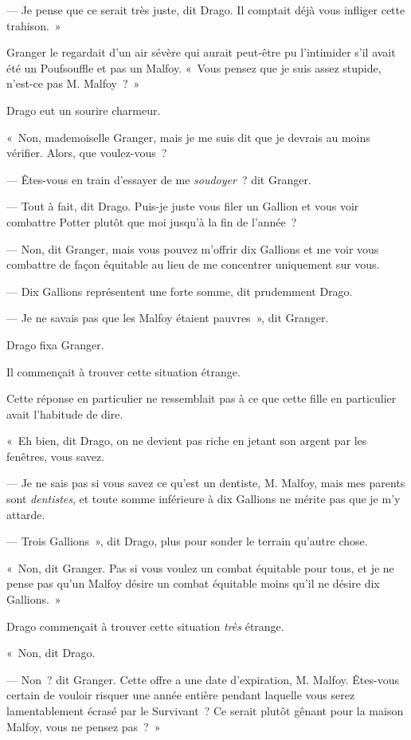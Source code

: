 --- Je pense que ce serait très juste, dit Drago. Il comptait déjà vous infliger cette trahison.~»

Granger le regardait d'un air sévère qui aurait peut-être pu l'intimider s'il avait été un Poufsouffle et pas un Malfoy. «~Vous pensez que je suis assez stupide, n'est-ce pas M. Malfoy~?~»

Drago eut un sourire charmeur.

«~Non, mademoiselle Granger, mais je me suis dit que je devrais au moins vérifier. Alors, que voulez-vous~?

--- Êtes-vous en train d'essayer de me \emph{soudoyer}~? dit Granger.

--- Tout à fait, dit Drago. Puis-je juste vous filer un Gallion et vous voir combattre Potter plutôt que moi jusqu'à la fin de l'année~?

--- Non, dit Granger, mais vous pouvez m'offrir dix Gallions et me voir vous combattre de façon équitable au lieu de me concentrer uniquement sur vous.

--- Dix Gallions représentent une forte somme, dit prudemment Drago.

--- Je ne savais pas que les Malfoy étaient pauvres~», dit Granger.

Drago fixa Granger.

Il commençait à trouver cette situation étrange.

Cette réponse en particulier ne ressemblait pas à ce que cette fille en particulier avait l'habitude de dire.

«~Eh bien, dit Drago, on ne devient pas riche en jetant son argent par les fenêtres, vous savez.

--- Je ne sais pas si vous savez ce qu'est un dentiste, M. Malfoy, mais mes parents sont \emph{dentistes}, et toute somme inférieure à dix Gallions ne mérite pas que je m'y attarde.

--- Trois Gallions~», dit Drago, plus pour sonder le terrain qu'autre chose.

«~Non, dit Granger. Pas si vous voulez un combat équitable pour tous, et je ne pense pas qu'un Malfoy désire un combat équitable moins qu'il ne désire dix Gallions.~»

Drago commençait à trouver cette situation \emph{très} étrange.

«~Non, dit Drago.

--- Non~? dit Granger. Cette offre a une date d'expiration, M. Malfoy. Êtes-vous certain de vouloir risquer une année entière pendant laquelle vous serez lamentablement écrasé par le Survivant~? Ce serait plutôt gênant pour la maison Malfoy, vous ne pensez pas~?~»

